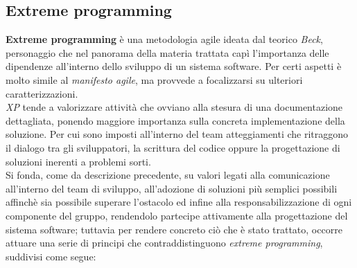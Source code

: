 \documentclass{article}
\begin{document}
\subsection*{Extreme programming}
\large
\textbf{Extreme programming} è una metodologia agile ideata dal teorico \textit{Beck}, personaggio che nel panorama della materia trattata capì l'importanza delle dipendenze all'interno dello sviluppo di un sistema software. Per certi aspetti è molto simile al \textit{manifesto agile}, ma provvede a focalizzarsi su ulteriori caratterizzazioni.\vspace*{14pt}\\
\textit{XP} tende a valorizzare attività che ovviano alla stesura di una documentazione dettagliata, ponendo maggiore importanza sulla concreta implementazione della soluzione. Per cui sono imposti all'interno del team atteggiamenti che ritraggono il dialogo tra gli sviluppatori, la scrittura del codice oppure la progettazione di soluzioni inerenti a problemi sorti.\vspace*{14pt}\\
Si fonda, come da descrizione precedente, su valori legati alla comunicazione all'interno del team di sviluppo, all'adozione di soluzioni più semplici possibili affinchè sia possibile superare l'ostacolo ed infine alla responsabilizzazione di ogni componente del gruppo, rendendolo partecipe attivamente alla progettazione del sistema software; tuttavia per rendere concreto ciò che è stato trattato, occorre attuare una serie di principi che contraddistinguono \textit{extreme programming}, suddivisi come segue:
\end{document}
